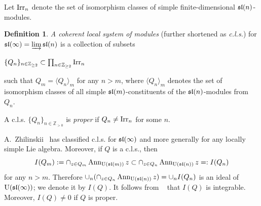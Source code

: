 \documentclass[10pt]{amsart}\oddsidemargin -1mm \evensidemargin -1mm \topmargin -15mm\headheight5mm \headsep 3.5mm \textheight 245mm\textwidth 170mm %
\theoremstyle{definition}\newtheorem{theorem}{Theorem}[section]\newtheorem{lemma}[theorem]{Lemma}\newtheorem{remark}[theorem]{Remark}\newtheorem{proposition}[theorem]{Proposition}\newtheorem{corollary}[theorem]{Corollary}\newtheorem{definition}[theorem]{Definition}\newtheorem{Ex}[theorem]{Example}
\newcommand{\APbre}[1]{\langle #1\rangle}
\newcounter{AP}
\begin{document}







Let $\operatorname{\mathrm{Irr}}_n$ denote the set of isomorphism classes of simple finite-dimensional $\frak{sl}(n)$-modules.
\begin{definition}{\it A coherent local system of modules} (further shortened as {\it c.l.s.}) for $\frak{sl}(\infty)=\varinjlim\frak{sl}(n)$ is a collection of subsets \begin{center}$\{Q_n\}_{n\in\mathbb Z_{\ge2}}\subset\prod_{n\in\mathbb Z_{\ge2}}\operatorname{\mathrm{Irr}}_n$\end{center} such that $Q_m=\APbre{Q_n}_m$ for any $n>m$, where $\APbre{Q_n}_m$ denotes the set of isomorphism classes of all simple $\frak{sl}(m)$-constituents of the $\frak{sl}(n)$-modules from $Q_n$.\end{definition}
A c.l.s. $\{Q_n\}_{n\in\mathbb Z_{>0}}$ is {\it proper} if $Q_n\ne\operatorname{\mathrm{Irr}}_n$ for some $n$.

A.~Zhilinskii~\cite{Zh2, Zh3} has classified c.l.s. for $\frak{sl}(\infty)$ and more generally for any
locally simple Lie algebra. Moreover, if $Q$ is a
c.l.s., then $$I(Q_m):=\cap_{z\in Q_m}\operatorname{\mathrm{Ann}}_{\operatorname{\mathrm{U}}(\frak{sl}(m))}z\subset\cap_{z\in
Q_n}\operatorname{\mathrm{Ann}}_{\operatorname{\mathrm{U}}(\frak{sl}(n))}z=:I(Q_n)$$ for any $n>m$. Therefore
$\cup_n(\cap_{z\in Q_n}\operatorname{\mathrm{Ann}}_{\operatorname{\mathrm{U}}(\frak{sl}(n))}z)=\cup_nI(Q_n)$ is an ideal of
$\operatorname{\mathrm{U}}(\frak{sl}(\infty))$; we denote it by $I(Q)$. It follows from {~\cite[Lemma 1.1.2]{Zh2}} that $I(Q)$ is
integrable. Moreover, $I(Q)\ne0$ if $Q$ is proper.
\end{document}
